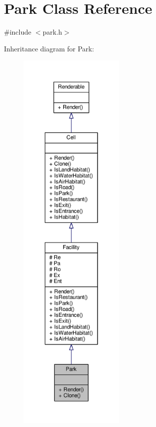 \hypertarget{classPark}{}\section{Park Class Reference}
\label{classPark}


{\ttfamily \#include $<$park.\+h$>$}



Inheritance diagram for Park\+:
\nopagebreak
\begin{figure}[H]
\begin{center}
\leavevmode
\includegraphics[height=550pt]{classPark__inherit__graph}
\end{center}
\end{figure}


